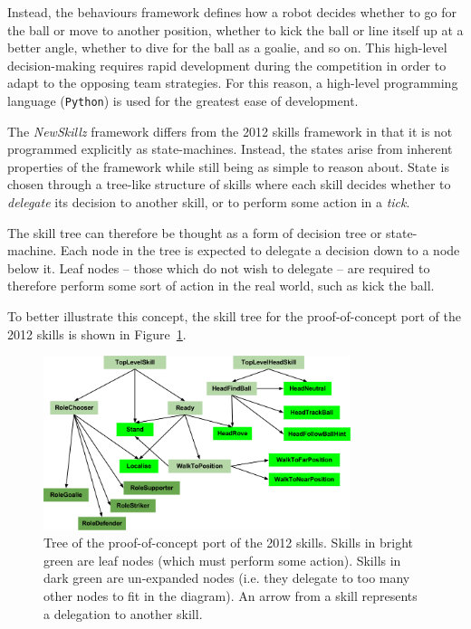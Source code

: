 Instead, the behaviours framework defines how a robot decides whether to go for the ball or move to another position, whether to kick the ball or line itself up at a better angle, whether to dive for the ball as a goalie, and so on. This high-level decision-making requires rapid development during the competition in order to adapt to the opposing team strategies. For this reason, a high-level programming language (\verb!Python!) is used for the greatest ease of development.

The \textit{NewSkillz} framework differs from the 2012 skills framework in that it is not programmed explicitly as state-machines. Instead, the states arise from inherent properties of the framework while still being as simple to reason about. State is chosen through a tree-like structure of skills where each skill decides whether to \textit{delegate} its decision to another skill, or to perform some action in a \textit{tick}.

The skill tree can therefore be thought as a form of decision tree or state-machine. Each node in the tree is expected to delegate a decision down to a node below it. Leaf nodes -- those which do not wish to delegate -- are required to therefore perform some sort of action in the real world, such as kick the ball.

To better illustrate this concept, the skill tree for the proof-of-concept port of the 2012 skills is shown in Figure~\ref{fig:skill_tree}.

\begin{figure}[h]
\centering
\includegraphics[width=0.8\textwidth]{img/skill_tree.png}
\caption{Tree of the proof-of-concept port of the 2012 skills. Skills in bright green are leaf nodes (which must perform some action). Skills in dark green are un-expanded nodes (i.e. they delegate to too many other nodes to fit in the diagram). An arrow from a skill represents a delegation to another skill.}
\label{fig:skill_tree}
\end{figure}

